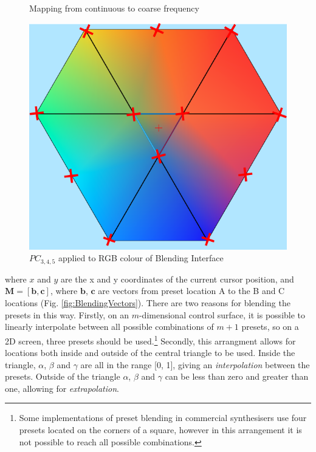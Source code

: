 \documentclass[11pt, oneside]{report}   	%
\renewcommand{\vec}[1]{\mathbf{#1}}
\begin{document}
\begin{figure}
	\caption{Mapping from continuous to coarse frequency}
	\label{fig:Freq Coarse}
	\includegraphics[width = \textwidth/3]{BlendingColours2.png}
	\caption{$PC_{3,4,5}$ applied to RGB colour of Blending Interface}
	\label{fig:BlendingColours}
	\vspace{-30pt}
\end{figure}
where $x$ and $y$ are the x and y coordinates of the current cursor position, and $\vec{M} =[\vec{b},  \vec{c}]$, where $\vec{b}$,  $\vec{c}$ are vectors from preset location A to the B and C locations (Fig. \ref{fig:BlendingVectors}). There are two reasons for blending the presets in this way. Firstly, on an $m$-dimensional control surface, it is possible to linearly interpolate between all possible combinations of $m+1$ presets, so on a 2D screen, three presets should be used.\footnote{Some implementations of preset blending in commercial synthesisers use four presets located on the corners of a square, however in this arrangement it is not possible to reach all possible combinations.} Secondly, this arrangment allows for locations both inside and outside of the central triangle to be used. Inside the triangle, $\alpha$, $\beta$ and $\gamma$ are all in the range [0, 1], giving an \emph{interpolation} between the presets. Outside of the triangle $\alpha$, $\beta$ and $\gamma$ can be less than zero and greater than one, allowing for \emph{extrapolation}.
\end{document}
